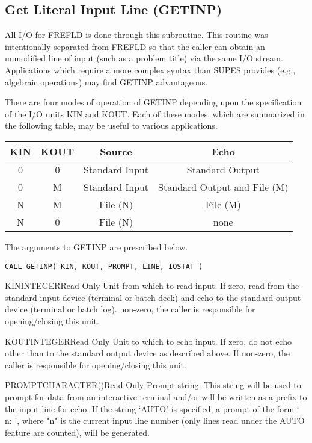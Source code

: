 \subsection{Get Literal Input Line (GETINP)}\label{sec:getinp}
All I/O for FREFLD is done through this subroutine.  This routine was
intentionally separated from FREFLD so that the caller can obtain an
unmodified line of input (such as a problem title) via the same I/O stream.
Applications which require a more complex syntax than SUPES provides (e.g.,
algebraic operations) may find GETINP advantageous.

There are four modes of operation of GETINP depending upon the specification
of the I/O units KIN and KOUT.  Each of these modes, which are summarized in
the following table, may be useful to various applications.

\begin{tabular}{|cccc|} \hline \hline
     KIN        &KOUT    &Source  &Echo\\\hline
        0       &0       &Standard Input  &Standard Output\\
        0       &M       &Standard Input  &Standard Output and File (M)\\
     N         &M       &File (N)        &File (M)\\
        N       &0       &File (N)        &none \\ \hline \hline
\end{tabular}

The arguments to GETINP are prescribed below.

\verb+CALL GETINP( KIN, KOUT, PROMPT, LINE, IOSTAT )+

\begin{argy}{KIN}{INTEGER}{Read Only}
Unit from which to read input.  If zero, read from the
standard input device (terminal or batch deck) and echo
to the standard output device (terminal or batch log).
non-zero, the caller is responsible for opening/closing this unit.
\end{argy}

\begin{argy}{KOUT}{INTEGER}{Read Only}
Unit to which to echo input.  If zero, do not echo other
than to the standard output device as described above.
If non-zero, the caller is responsible for opening/closing this unit.
\end{argy}

\begin{argy}{PROMPT}{CHARACTER\last(\last)}{Read Only}
Prompt string.  This string will be used to prompt for
data from an interactive terminal and/or will be written
as a prefix to the input line for echo.  If the string
`AUTO' is specified, a prompt of the form `   n: ',
where "n" is the current input line number (only lines
read under the AUTO feature are counted), will be
generated.
\end{argy}

